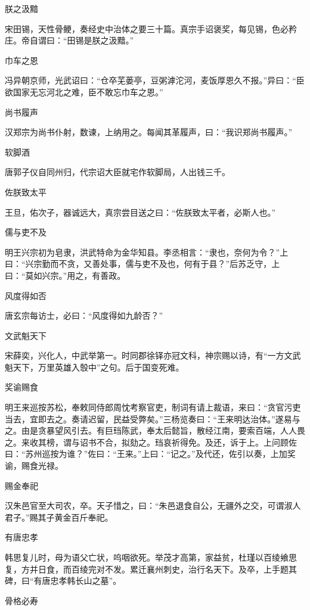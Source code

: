 \documentclass[a4paper,12pt,UTF8,twoside]{ctexbook}
\begin{document}
    朕之汲黯
    
    宋田锡，天性骨鲠，奏经史中治体之要三十篇。真宗手诏褒奖，每见锡，色必矜庄。帝自谓曰：“田锡是朕之汲黯。”
    
    巾车之恩
    
    冯异朝京师，光武诏曰：“仓卒芜蒌亭，豆粥滹沱河，麦饭厚恩久不报。”异曰：“臣欲国家无忘河北之难，臣不敢忘巾车之恩。”
    
    尚书履声
    
    汉郑宗为尚书仆射，数谏，上纳用之。每闻其革履声，曰：“我识郑尚书履声。”
    
    软脚酒
    
    唐郭子仪自同州归，代宗诏大臣就宅作软脚局，人出钱三千。
    
    佐朕致太平
    
    王旦，佑次子，器诚远大，真宗尝目送之曰：“佐朕致太平者，必斯人也。”
    
    儒与吏不及
    
    明王兴宗初为皂隶，洪武特命为金华知县。李丞相言：“隶也，奈何为令？”上曰：“兴宗勤而不贪，又善处事，儒与吏不及也，何有于县？”后苏乏守，上曰：“莫如兴宗。”用之，有善政。
    
    风度得如否
    
    唐玄宗每访士，必曰：“风度得如九龄否？”
    
    文武魁天下
    
    宋薛奕，兴化人，中武举第一。时同郡徐铎亦冠文科，神宗赐以诗，有“一方文武魁天下，万里英雄入彀中”之句。后于国变死难。
    
    奖谕赐食
    
    明王来巡按苏松，奉敕同侍郎周忱考察官吏，制词有请上裁语，来曰：“贪官污吏当去，宜即去之。奏请迟留，民益受弊矣。”三杨览奏曰：“王来明达治体。”遂易与之。由是贪暴望风引去。有巨珰陈武，奉太后懿旨，散经江南，要索百端，人人畏之。来收其榜，谓与诏书不合，拟劾之。珰哀祈得免。及还，诉于上。上问顾佐曰：“苏州巡按为谁？”佐曰：“王来。”上曰：“记之。”及代还，佐引以奏，上加奖谕，赐食光禄。
    
    赐金奉祀
    
    汉朱邑官至大司农，卒。天子惜之，曰：“朱邑退食自公，无疆外之交，可谓淑人君子。”赐其子黄金百斤奉祀。
    
    有唐忠孝
    
    韩思复儿时，母为语父亡状，呜咽欲死。举茂才高第，家益贫，杜瑾以百绫飨思复，方并日食，而百绫完对不发。累迁襄州刺史，治行名天下。及卒，上手题其碑，曰“有唐忠孝韩长山之墓”。
    
    骨格必寿
    
\end{document}
